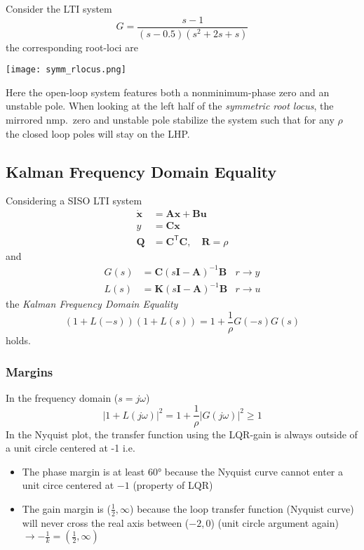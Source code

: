 \begin{examplesection}
    Consider the LTI system
    \noindent\begin{equation*}
        G = \frac{s-1}{(s-0.5)(s^2+2s+s)}
    \end{equation*}
    the corresponding root-loci are
    \begin{center}
        \texttt{[image: symm\_rlocus.png]}
    \end{center}
    Here the open-loop system features both a nonminimum-phase zero and an unstable pole.
    When looking at the left half of the \textit{symmetric root locus}, the mirrored nmp.\ zero and unstable pole stabilize the system such that
    for any $\rho$ the closed loop poles will stay on the LHP.
\end{examplesection}

\subsection{Kalman Frequency Domain Equality}
Considering a SISO LTI system
\noindent\begin{align*}
    \dot{\mathbf{x}} & = \mathbf{Ax} + \mathbf{Bu}                                 \\
    y                & = \mathbf{Cx}                                               \\
    \mathbf{Q}       & = \mathbf{C}^{\mathsf{T}} \mathbf{C}, \quad \mathbf{R}=\rho
\end{align*}
and
\noindent\begin{align*}
    G(s) & = \mathbf{C}{(s \mathbf{I}-\mathbf{A})}^{-1}\mathbf{B} & r\to y \\
    L(s) & = \mathbf{K}{(s \mathbf{I}-\mathbf{A})}^{-1}\mathbf{B} & r\to u
\end{align*}
the \textit{Kalman Frequency Domain Equality}
\noindent\begin{equation*}
    (1+L(-s))(1+L(s)) = 1+\frac{1}{\rho}G(-s)G(s)
\end{equation*}
holds.

\subsubsection{Margins}
In the frequency domain ($s=j\omega$)
\noindent\begin{equation*}
    \left|1+L(j\omega)\right|^2=1+\frac1\rho\left|G(j\omega)\right|^2\geq1
\end{equation*}
In the Nyquist plot, the transfer function using the LQR-gain is always outside of a unit circle centered at -1 i.e.
\begin{itemize}
    \item The phase margin is at least 60° because the Nyquist curve cannot enter a unit circe centered at $-1$ (property of LQR)
    \item The gain margin is ($\frac{1}{2},\infty$) because the loop transfer function (Nyquist curve) will never cross the real axis between ($-2, 0$) (unit circle argument again)\newline $\to -\frac{1}{k} = (\frac{1}{2}, \infty)$
\end{itemize}